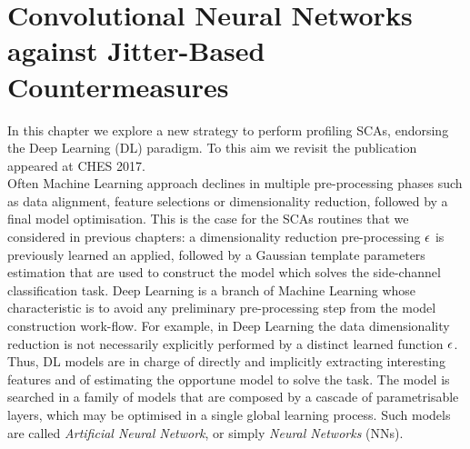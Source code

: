 
\chapter{Convolutional Neural Networks against Jitter-Based Countermeasures} %

\label{ChapterCNN}

In this chapter we explore a new strategy to perform profiling SCAs, endorsing the Deep Learning (DL) paradigm. To this aim we revisit the publication \cite{cagli2017defeating} appeared at CHES 2017.\\

Often Machine Learning approach declines in multiple pre-processing phases such as data alignment, feature selections or dimensionality reduction, followed by a final model optimisation. This is the case for the SCAs routines that we considered in previous chapters: a dimensionality reduction pre-processing $\epsilon$ is previously learned an applied, followed by a Gaussian template parameters estimation that are used to construct the model which solves the side-channel classification task.  Deep Learning is a branch of Machine Learning whose characteristic is to avoid any preliminary pre-processing step from the model construction work-flow. For example, in Deep Learning the data dimensionality reduction is not necessarily explicitly performed by a distinct learned  function $\epsilon$. Thus, DL models are in charge of directly and implicitly extracting interesting features and of estimating the opportune model to solve the task. The model is searched in a family of models that are composed by a cascade of parametrisable layers, which may be optimised in a single global learning process. Such models are called \emph{Artificial Neural Network}, or simply \emph{Neural Networks} (NNs). \\

